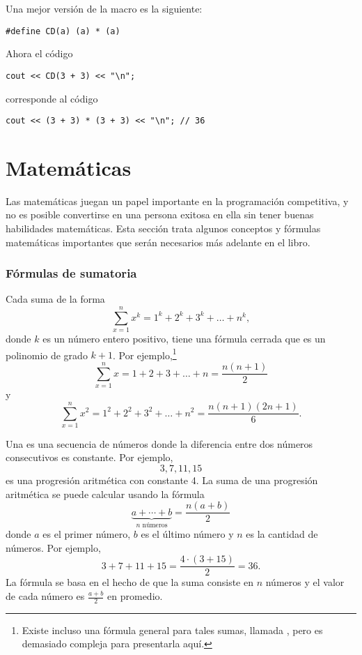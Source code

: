 Una mejor versión de la macro es la siguiente:
\begin{lstlisting}
#define CD(a) (a) * (a)
\end{lstlisting}
Ahora el código
\begin{lstlisting}
cout << CD(3 + 3) << "\n";
\end{lstlisting}
corresponde al código
\begin{lstlisting}
cout << (3 + 3) * (3 + 3) << "\n"; // 36
\end{lstlisting}

\section{Matemáticas}

Las matemáticas juegan un papel importante en la
programación competitiva, y no es posible convertirse
en una persona exitosa en ella sin
tener buenas habilidades matemáticas.
Esta sección trata algunos conceptos y fórmulas
matemáticas importantes que
serán necesarios más adelante en el libro.

\subsubsection{Fórmulas de sumatoria}


Cada suma de la forma
\[\sum_{x=1}^n x^k = 1^k+2^k+3^k+\ldots+n^k,\]
donde $k$ es un número entero positivo,
tiene una fórmula cerrada que es un
polinomio de grado $k+1$.
Por ejemplo,\footnote{Existe incluso una fórmula general para tales
    sumas, llamada , pero es demasiado compleja
    para presentarla aquí.}
\[\sum_{x=1}^n x = 1+2+3+\ldots+n = \frac{n(n+1)}{2}\]
y
\[\sum_{x=1}^n x^2 = 1^2+2^2+3^2+\ldots+n^2 = \frac{n(n+1)(2n+1)}{6}.\]

Una  es una
secuencia de números donde la diferencia
entre dos números consecutivos
es constante. Por ejemplo,
\[3, 7, 11, 15\]
es una progresión aritmética con constante 4.
La suma de una progresión aritmética se puede calcular
usando la fórmula
\[\underbrace{a + \cdots + b}_{n \,\, \textrm{números}} = \frac{n(a+b)}{2}\]
donde $a$ es el primer número,
$b$ es el último número y
$n$ es la cantidad de números.
Por ejemplo,
\[3+7+11+15=\frac{4 \cdot (3+15)}{2} = 36.\]
La fórmula se basa en el hecho
de que la suma consiste en $n$ números y
el valor de cada número es $\frac{a+b}{2}$ en promedio.

